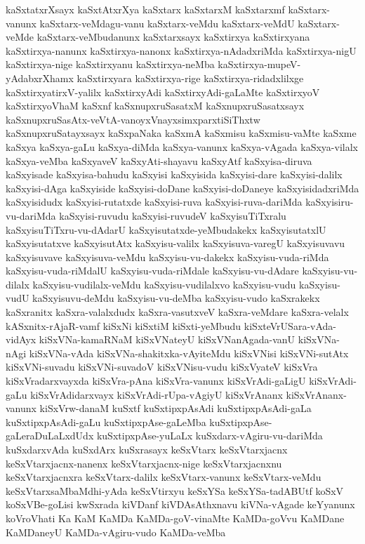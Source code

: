 {kaSxtatxrXsayx
kaSxtAtxrXya
kaSxtarx
kaSxtarxM
kaSxtarxmf
kaSxtarx-vanunx
kaSxtarx-veMdagu-vanu
kaSxtarx-veMdu
kaSxtarx-veMdU
kaSxtarx-veMde
kaSxtarx-veMbudanunx
kaSxtarxsayx
kaSxtirxya
kaSxtirxyana
kaSxtirxya-nanunx
kaSxtirxya-nanonx
kaSxtirxya-nAdadxriMda
kaSxtirxya-nigU
kaSxtirxya-nige
kaSxtirxyanu
kaSxtirxya-neMba
kaSxtirxya-mupeV-yAdabxrXhamx
kaSxtirxyara
kaSxtirxya-rige
kaSxtirxya-ridadxlilxge
kaSxtirxyatirxV-yalilx
kaSxtirxyAdi
kaSxtirxyAdi-gaLaMte
kaSxtirxyoV
kaSxtirxyoVhaM
kaSxnf
kaSxnupxruSasatxM
kaSxnupxruSasatxsayx
kaSxnupxruSasAtx-veVtA-vanoyxVnayxsimxparxtiSiThxtw
kaSxnupxruSatayxsayx
kaSxpaNaka
kaSxmA
kaSxmisu
kaSxmisu-vaMte
kaSxme
kaSxya
kaSxya-gaLu
kaSxya-diMda
kaSxya-vanunx
kaSxya-vAgada
kaSxya-vilalx
kaSxya-veMba
kaSxyaveV
kaSxyAti-shayavu
kaSxyAtf
kaSxyisa-diruva
kaSxyisade
kaSxyisa-bahudu
kaSxyisi
kaSxyisida
kaSxyisi-dare
kaSxyisi-dalilx
kaSxyisi-dAga
kaSxyiside
kaSxyisi-doDane
kaSxyisi-doDaneye
kaSxyisidadxriMda
kaSxyisidudx
kaSxyisi-rutatxde
kaSxyisi-ruva
kaSxyisi-ruva-dariMda
kaSxyisiru-vu-dariMda
kaSxyisi-ruvudu
kaSxyisi-ruvudeV
kaSxyisuTiTxralu
kaSxyisuTiTxru-vu-dAdarU
kaSxyisutatxde-yeMbudakekx
kaSxyisutatxlU
kaSxyisutatxve
kaSxyisutAtx
kaSxyisu-valilx
kaSxyisuva-varegU
kaSxyisuvavu
kaSxyisuvave
kaSxyisuva-veMdu
kaSxyisu-vu-dakekx
kaSxyisu-vuda-riMda
kaSxyisu-vuda-riMdalU
kaSxyisu-vuda-riMdale
kaSxyisu-vu-dAdare
kaSxyisu-vu-dilalx
kaSxyisu-vudilalx-veMdu
kaSxyisu-vudilalxvo
kaSxyisu-vudu
kaSxyisu-vudU
kaSxyisuvu-deMdu
kaSxyisu-vu-deMba
kaSxyisu-vudo
kaSxrakekx
kaSxranitx
kaSxra-valalxdudx
kaSxra-vasutxveV
kaSxra-veMdare
kaSxra-velalx
kASxnitx-rAjaR-vamf
kiSxNi
kiSxtiM
kiSxti-yeMbudu
kiSxteVrUSara-vAda-vidAyx
kiSxVNa-kamaRNaM
kiSxVNateyU
kiSxVNanAgada-vanU
kiSxVNa-nAgi
kiSxVNa-vAda
kiSxVNa-shakitxka-vAyiteMdu
kiSxVNisi
kiSxVNi-sutAtx
kiSxVNi-suvadu
kiSxVNi-suvadoV
kiSxVNisu-vudu
kiSxVyateV
kiSxVra
kiSxVradarxvayxda
kiSxVra-pAna
kiSxVra-vanunx
kiSxVrAdi-gaLigU
kiSxVrAdi-gaLu
kiSxVrAdidarxvayx
kiSxVrAdi-rUpa-vAgiyU
kiSxVrAnanx
kiSxVrAnanx-vanunx
kiSxVrw-danaM
kuSxtf
kuSxtipxpAsAdi
kuSxtipxpAsAdi-gaLa
kuSxtipxpAsAdi-gaLu
kuSxtipxpAse-gaLeMba
kuSxtipxpAse-gaLeraDuLaLxdUdx
kuSxtipxpAse-yuLaLx
kuSxdarx-vAgiru-vu-dariMda
kuSxdarxvAda
kuSxdArx
kuSxrasayx
keSxVtarx
keSxVtarxjacnx
keSxVtarxjacnx-nanenx
keSxVtarxjacnx-nige
keSxVtarxjacnxnu
keSxVtarxjacnxra
keSxVtarx-dalilx
keSxVtarx-vanunx
keSxVtarx-veMdu
keSxVtarxsaMbaMdhi-yAda
keSxVtirxyu
keSxYSa
keSxYSa-tadABUtf
koSxV
koSxVBe-goLisi
kwSxrada
kiVDanf
kiVDAsAthxnavu
kiVNa-vAgade
keYyanunx
koVroVhati
Ka
KaM
KaMDa
KaMDa-goV-vinaMte
KaMDa-goVvu
KaMDane
KaMDaneyU
KaMDa-vAgiru-vudo
KaMDa-veMba
}
